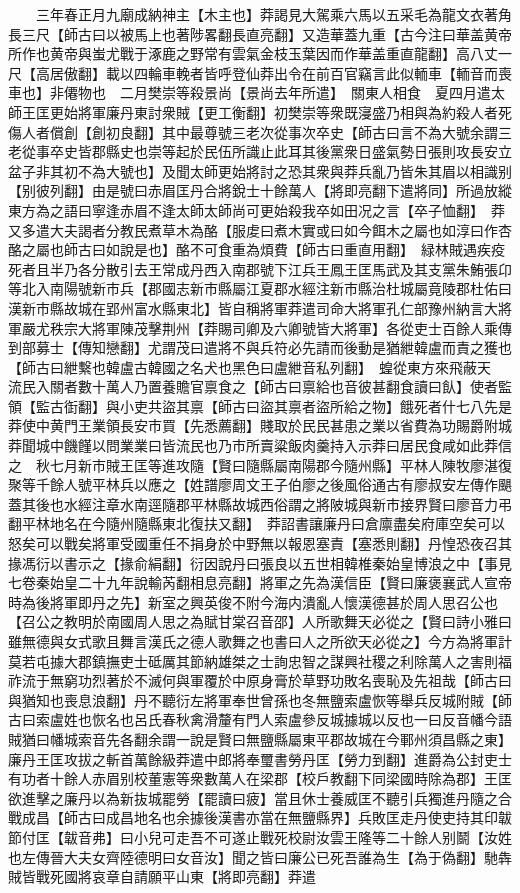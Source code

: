 　　三年春正月九廟成納神主【木主也】莽謁見大駕乘六馬以五采毛為龍文衣著角長三尺【師古曰以被馬上也著陟畧翻長直亮翻】又造華蓋九重【古今注曰華盖黄帝所作也黄帝與蚩尤戰于涿鹿之野常有雲氣金枝玉葉因而作華盖重直龍翻】高八丈一尺【高居傲翻】載以四輪車輓者皆呼登仙莽出令在前百官竊言此似輀車【輀音而喪車也】非僊物也　二月樊崇等殺景尚【景尚去年所遣】　關東人相食　夏四月遣太師王匡更始將軍廉丹東討衆賊【更工衡翻】初樊崇等衆既寖盛乃相與為約殺人者死傷人者償創【創初良翻】其中最尊號三老次從事次卒史【師古曰言不為大號余謂三老從事卒史皆郡縣史也崇等起於民伍所識止此耳其後黨衆日盛氣勢日張則攻長安立盆子非其初不為大號也】及聞太師更始將討之恐其衆與莽兵亂乃皆朱其眉以相識别【别彼列翻】由是號曰赤眉匡丹合將銳士十餘萬人【將即亮翻下遣將同】所過放縱東方為之語曰寧逢赤眉不逢太師太師尚可更始殺我卒如田况之言【卒子恤翻】　莽又多遣大夫謁者分教民煮草木為酪【服䖍曰煮木實或曰如今餌木之屬也如淳曰作杏酪之屬也師古曰如說是也】酪不可食重為煩費【師古曰重直用翻】　緑林賊遇疾疫死者且半乃各分散引去王常成丹西入南郡號下江兵王鳳王匡馬武及其支黨朱鮪張卬等北入南陽號新市兵【郡國志新市縣屬江夏郡水經注新市縣治杜城屬竟陵郡杜佑曰漢新市縣故城在郢州富水縣東北】皆自稱將軍莽遣司命大將軍孔仁部豫州納言大將軍嚴尤秩宗大將軍陳茂擊荆州【莽賜司卿及六卿號皆大將軍】各從吏士百餘人乘傳到部募士【傳知戀翻】尤謂茂曰遣將不與兵符必先請而後動是猶紲韓盧而責之獲也【師古曰紲繫也韓盧古韓國之名犬也黑色曰盧紲音私列翻】　蝗從東方來飛蔽天　流民入關者數十萬人乃置養贍官禀食之【師古曰禀給也音彼甚翻食讀曰飤】使者監領【監古衘翻】與小吏共盜其禀【師古曰盜其禀者盜所給之物】餓死者什七八先是莽使中黄門王業領長安市買【先悉薦翻】賤取於民民甚患之業以省費為功賜爵附城莽聞城中饑饉以問業業曰皆流民也乃市所賣粱飯肉羹持入示莽曰居民食咸如此莽信之　秋七月新市賊王匡等進攻隨【賢曰隨縣屬南陽郡今隨州縣】平林人陳牧廖湛復聚等千餘人號平林兵以應之【姓譜廖周文王子伯廖之後風俗通古有廖叔安左傳作颶蓋其後也水經注章水南逕隨郡平林縣故城西俗謂之將陂城與新市接界賢曰廖音力弔翻平林地名在今隨州隨縣東北復扶又翻】　莽詔書讓廉丹曰倉廪盡矣府庫空矣可以怒矣可以戰矣將軍受國重任不捐身於中野無以報恩塞責【塞悉則翻】丹惶恐夜召其掾馮衍以書示之【掾俞絹翻】衍因說丹曰張良以五世相韓椎秦始皇博浪之中【事見七卷秦始皇二十九年說輸芮翻相息亮翻】將軍之先為漢信臣【賢曰廉褒襄武人宣帝時為後將軍即丹之先】新室之興英俊不附今海内潰亂人懷漢德甚於周人思召公也【召公之教明於南國周人思之為賦甘棠召音邵】人所歌舞天必從之【賢曰詩小雅曰雖無德與女式歌且舞言漢氏之德人歌舞之也書曰人之所欲天必從之】今方為將軍計莫若屯據大郡鎮撫吏士砥厲其節納雄桀之士詢忠智之謀興社稷之利除萬人之害則福祚流于無窮功烈著於不滅何與軍覆於中原身膏於草野功敗名喪恥及先祖哉【師古曰與猶知也喪息浪翻】丹不聽衍左將軍奉世曾孫也冬無鹽索盧恢等舉兵反城附賊【師古曰索盧姓也恢名也呂氏春秋禽滑釐有門人索盧參反城據城以反也一曰反音幡今語賊猶曰幡城索音先各翻余謂一說是賢曰無鹽縣屬東平郡故城在今鄆州須昌縣之東】廉丹王匡攻拔之斬首萬餘級莽遣中郎將奉璽書勞丹匡【勞力到翻】進爵為公封吏士有功者十餘人赤眉别校董憲等衆數萬人在梁郡【校戶教翻下同梁國時除為郡】王匡欲進擊之廉丹以為新抜城罷勞【罷讀曰疲】當且休士養威匡不聽引兵獨進丹隨之合戰成昌【師古曰成昌地名也余據後漢書亦當在無鹽縣界】兵敗匡走丹使吏持其印韍節付匡【韍音弗】曰小兒可走吾不可遂止戰死校尉汝雲王隆等二十餘人别鬬【汝姓也左傳晉大夫女齊陸德明曰女音汝】聞之皆曰廉公已死吾誰為生【為于偽翻】馳犇賊皆戰死國將哀章自請願平山東【將即亮翻】莽遣